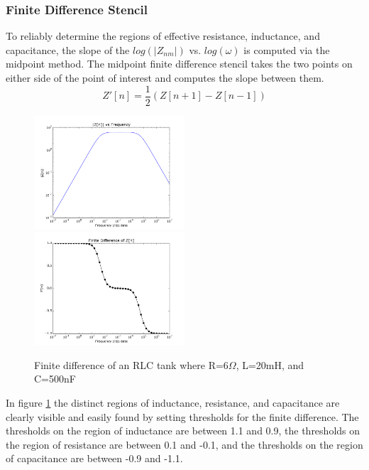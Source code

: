 \subsubsection{Finite Difference Stencil}
To reliably determine the regions of effective resistance, inductance, and capacitance, the slope of the $log{(|Z_{nm}|)}$ vs. $log{(\omega)}$ is computed via the midpoint method.
The midpoint finite difference stencil takes the two points on either side of the point of interest and computes the slope between them.\\
\begin{equation*}
Z'[n]=\frac{1}{2}(Z[n+1]-Z[n-1])
\end{equation*}
\begin{figure}[H]
\includegraphics[width=0.5\textwidth]{../fd4.png}
\includegraphics[width=0.5\textwidth]{../fd3.png}
\caption{Finite difference of an RLC tank where R=6$\Omega$, L=20mH, and C=500nF}
\label{fig:fd}
\end{figure}

In figure \ref{fig:fd} the distinct regions of inductance, resistance, and capacitance are clearly visible and easily found by setting thresholds for the finite difference.
The thresholds on the region of inductance are between 1.1 and 0.9, the thresholds on the region of resistance are between 0.1 and -0.1, and the thresholds on the region of capacitance are between -0.9 and -1.1.

